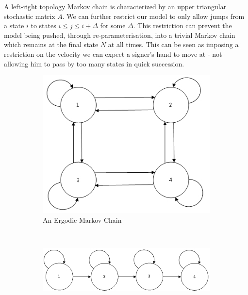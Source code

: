 A left-right topology Markov chain is characterized by an upper triangular stochastic matrix $A$. We can further restrict our model to only allow jumps from a state $i$ to states $i \leq j \leq i+\Delta$ for some $\Delta$. This restriction can prevent the model being pushed, through re-parameterisation, into a trivial Markov chain which remains at the final state $N$ at all times. This can be seen as imposing a restriction on the velocity we can expect a signer's hand to move at - not allowing him to pass by too many states in quick succession.

\begin{figure} [t]
        \centering
        \begin{subfigure}[b]{0.45\textwidth}
                \centering
                \includegraphics[width=1.0\textwidth]{ThesisFigs/erdogicMC}
                \caption{An Ergodic Markov Chain}
                \label{fig:unclust}
        \end{subfigure} \\
        \begin{subfigure}[b]{0.5\textwidth}
                \centering
                \includegraphics[width=1.0\textwidth]{ThesisFigs/del1LRMC}

\end{subfigure}
\end{figure}
